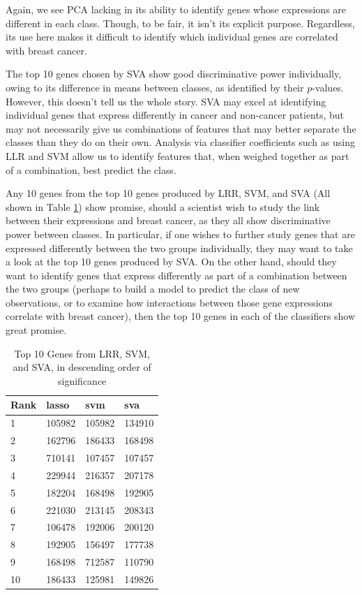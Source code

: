 \documentclass[twocolumn]{article}
\begin{document}
Again, we see PCA lacking in its ability to identify genes whose expressions are different in each class. Though, to be fair, it isn't its explicit purpose. Regardless, its use here makes it difficult to identify which individual genes are correlated with breast cancer.

The top 10 genes chosen by SVA show good discriminative power individually, owing to its difference in means between classes, as identified by their $p$-values. However, this doesn't tell us the whole story. SVA may excel at identifying individual genes that express differently in cancer and non-cancer patients, but may not necessarily give us combinations of features that may better separate the classes than they do on their own. Analysis via classifier coefficients such as using LLR and SVM allow us to identify features that, when weighed together as part of a combination, best predict the class.

Any 10 genes from the top 10 genes produced by LRR, SVM, and SVA (All shown in Table \ref{tab:top-all}) show promise, should a scientist wish to study the link between their expressions and breast cancer, as they all show discriminative power between classes. In particular, if one wishes to further study genes that are expressed differently between the two groups individually, they may want to take a look at the top 10 genes produced by SVA. On the other hand, should they want to identify genes that express differently as part of a combination between the two groups (perhaps to build a model to predict the class of new observations, or to examine how interactions between those gene expressions correlate with breast cancer), then the top 10 genes in each of the classifiers show great promise.

\begin{table}[H]
    \centering
    \begin{tabular}{llll}
    \toprule
    Rank & lasso & svm & sva \\
    \midrule
    1 & 105982 & 105982 & 134910 \\
    2 & 162796 & 186433 & 168498 \\
    3 & 710141 & 107457 & 107457 \\
    4 & 229944 & 216357 & 207178 \\
    5 & 182204 & 168498 & 192905 \\
    6 & 221030 & 213145 & 208343 \\
    7 & 106478 & 192006 & 200120 \\
    8 & 192905 & 156497 & 177738 \\
    9 & 168498 & 712587 & 110790 \\
    10 & 186433 & 125981 & 149826 \\
    \bottomrule
    \end{tabular}
    \caption{Top 10 Genes from LRR, SVM, and SVA, in descending order of significance}
    \label{tab:top-all}
\end{table}
\end{document}
